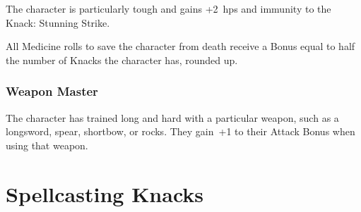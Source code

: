 \begin{multicols}{2}
The character is particularly tough and gains +2~\glspl{hp} and immunity to the Knack: Stunning Strike.

All Medicine rolls to save the character from death receive a Bonus equal to half the number of Knacks the character has, rounded up.

\subsubsection{Weapon Master}

The character has trained long and hard with a particular weapon, such as a longsword, spear, shortbow, or rocks.
They gain~+1 to their Attack Bonus when using that weapon.

\end{multicols}

\section{Spellcasting Knacks}

